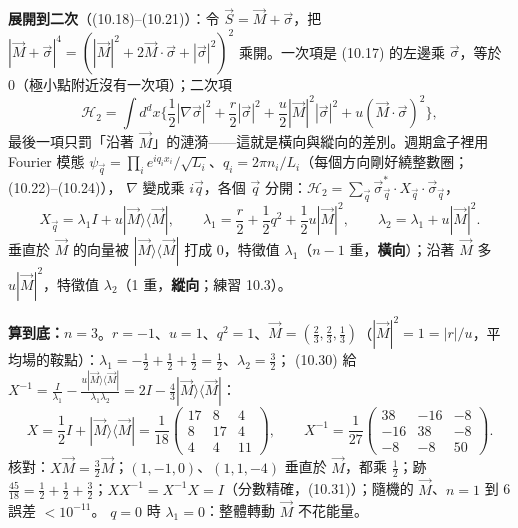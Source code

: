 \textbf{展開到二次}（(10.18)--(10.21)）：令 $\vec S=\vec M+\vec\sigma$，把 $|\vec M+\vec\sigma|^4=(|\vec M|^2+2\vec M\cdot\vec\sigma+|\vec\sigma|^2)^2$ 乘開。一次項是 (10.17) 的左邊乘 $\vec\sigma$，等於 0（極小點附近沒有一次項）；二次項
\[\mathcal H_2=\int d^dx\Big\{\frac12|\nabla\vec\sigma|^2+\frac r2|\vec\sigma|^2+\frac u2|\vec M|^2|\vec\sigma|^2+u(\vec M\cdot\vec\sigma)^2\Big\},\tag{10.21}\]
最後一項只罰「沿著 $\vec M$」的漣漪——這就是橫向與縱向的差別。週期盒子裡用 Fourier 模態 $\psi_{\vec q}=\prod_ie^{iq_ix_i}/\sqrt{L_i}$、$q_i=2\pi n_i/L_i$（每個方向剛好繞整數圈；(10.22)--(10.24)），
$\nabla$ 變成乘 $i\vec q$，各個 $\vec q$ 分開：$\mathcal H_2=\sum_{\vec q}\vec\sigma_{\vec q}^*\cdot X_{\vec q}\cdot\vec\sigma_{\vec q}$，
\[X_{\vec q}=\lambda_1I+u|\vec M\rangle\langle\vec M|,\qquad\lambda_1=\frac r2+\frac12q^2+\frac12u|\vec M|^2,\qquad\lambda_2=\lambda_1+u|\vec M|^2.\tag{10.27--10.29}\]
垂直於 $\vec M$ 的向量被 $|\vec M\rangle\langle\vec M|$ 打成 0，特徵值 $\lambda_1$（$n-1$ 重，\textbf{橫向}）；沿著 $\vec M$ 多 $u|\vec M|^2$，特徵值 $\lambda_2$（1 重，\textbf{縱向}；練習 10.3）。

\textbf{算到底：$n=3$}。$r=-1$、$u=1$、$q^2=1$、$\vec M=(\frac23,\frac23,\frac13)$（$|\vec M|^2=1=|r|/u$，平均場的鞍點）：$\lambda_1=-\frac12+\frac12+\frac12=\frac12$、$\lambda_2=\frac32$；
(10.30) 給 $X^{-1}=\frac I{\lambda_1}-\frac{u|\vec M\rangle\langle\vec M|}{\lambda_1\lambda_2}=2I-\frac43|\vec M\rangle\langle\vec M|$：
\[X=\frac12I+|\vec M\rangle\langle\vec M|=\frac1{18}\begin{pmatrix}17&8&4\\8&17&4\\4&4&11\end{pmatrix},\qquad X^{-1}=\frac1{27}\begin{pmatrix}38&-16&-8\\-16&38&-8\\-8&-8&50\end{pmatrix}.\tag{10.30}\]
核對：$X\vec M=\frac32\vec M$；$(1,-1,0)$、$(1,1,-4)$ 垂直於 $\vec M$，都乘 $\frac12$；跡 $\frac{45}{18}=\frac12+\frac12+\frac32$；$XX^{-1}=X^{-1}X=I$（分數精確，(10.31)）；隨機的 $\vec M$、$n=1$ 到 6 誤差 $<10^{-11}$。
$q=0$ 時 $\lambda_1=0$：整體轉動 $\vec M$ 不花能量。

